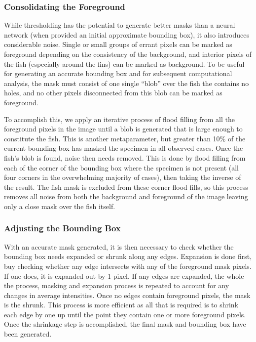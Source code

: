 \documentclass[conference]{IEEEtran}
\begin{document}
\subsubsection{Consolidating the Foreground}
While thresholding has the potential to generate better masks than a neural network (when provided an initial approximate bounding box), it also introduces considerable noise. Single or small groups of errant pixels can be marked as foreground depending on the consistency of the background, and interior pixels of the fish (especially around the fins) can be marked as background. To be useful for generating an accurate bounding box and for subsequent computational analysis, the mask must consist of one single ``blob'' over the fish the contains no holes, and no other pixels disconnected from this blob can be marked as foreground.

To accomplish this, we apply an iterative process of flood filling from all the foreground pixels in the image until a blob is generated that is large enough to constitute the fish. This is another metaparameter, but greater than 10\% of the current bounding box has masked the specimen in all observed cases. Once the fish's blob is found, noise then needs removed. This is done by flood filling from each of the corner of the bounding box where the specimen is not present (all four corners in the overwhelming majority of cases), then taking the inverse of the result. The fish mask is excluded from these corner flood fills, so this process removes all noise from both the background and foreground of the image leaving only a close mask over the fish itself.

\subsubsection{Adjusting the Bounding Box}
With an accurate mask generated, it is then necessary to check whether the bounding box needs expanded or shrunk along any edges. Expansion is done first, buy checking whether any edge intersects with any of the foreground mask pixels. If one does, it is expanded out by 1 pixel. If any edges are expanded, the whole the process, masking and expansion process is repeated to account for any changes in average intensities. Once no edges contain foreground pixels, the mask is the shrunk. This process is more efficient as all that is required is to shrink each edge by one up until the point they contain one or more foreground pixels. Once the shrinkage step is accomplished, the final mask and bounding box have been generated.
\end{document}
